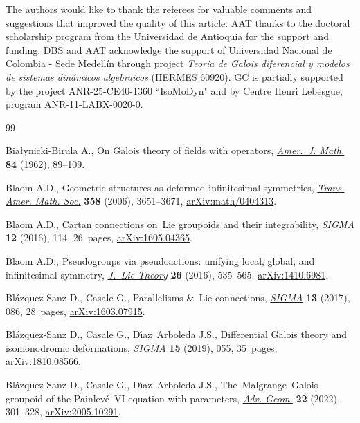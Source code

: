 \documentclass[pdftex]{sigma}
\numberwithin{equation}{section}
\theoremstyle{definition}
\begin{document}
The authors would like to thank the referees for valuable comments and suggestions that improved the quality of this article.
AAT thanks to the doctoral scholarship program from the Universidad de Antioquia for the support and funding.
DBS and AAT acknowledge the support of Universidad Nacional de Colombia - Sede Medell\'in through project \emph{Teoría de Galois diferencial y modelos de sistemas dinámicos algebraicos} (HERMES 60920).
\noindent GC is partially supported by the project ANR-25-CE40-1360 ``IsoMoDyn" and by Centre Henri Lebesgue, program ANR-11-LABX-0020-0.

\begin{thebibliography}{99}
\footnotesize\itemsep=0pt

Bia{\l}ynicki-Birula A., On {G}alois theory of fields with operators,
 \href{https://doi.org/10.2307/2372805}{\textit{Amer.~J. Math.}} \textbf{84}
 (1962), 89--109.

Blaom A.D., Geometric structures as deformed infinitesimal symmetries,
 \href{https://doi.org/10.1090/S0002-9947-06-04057-8}{\textit{Trans. Amer.
 Math. Soc.}} \textbf{358} (2006), 3651--3671,
 \href{https://arxiv.org/abs/math/0404313}{arXiv:math/0404313}.

Blaom A.D., Cartan connections on~{L}ie groupoids and their integrability,
 \href{https://doi.org/10.3842/SIGMA.2016.114}{\textit{SIGMA}} \textbf{12}
 (2016), 114, 26~pages,
 \href{https://arxiv.org/abs/1605.04365}{arXiv:1605.04365}.

Blaom A.D., Pseudogroups via pseudoactions: unifying local, global, and
 infinitesimal symmetry,
 \href{https://doi.org/10.5802/jolt.900}{\textit{J.~Lie Theory}} \textbf{26}
 (2016), 535--565, \href{https://arxiv.org/abs/1410.6981}{arXiv:1410.6981}.

Bl\'azquez-Sanz D., Casale G., Parallelisms \&~{L}ie connections,
 \href{https://doi.org/10.3842/SIGMA.2017.086}{\textit{SIGMA}} \textbf{13}
 (2017), 086, 28~pages,
 \href{https://arxiv.org/abs/1603.07915}{arXiv:1603.07915}.

Bl\'azquez-Sanz D., Casale G., D\'{\i}az~Arboleda J.S., Differential {G}alois
 theory and isomonodromic deformations,
 \href{https://doi.org/10.3842/SIGMA.2019.055}{\textit{SIGMA}} \textbf{15}
 (2019), 055, 35~pages,
 \href{https://arxiv.org/abs/1810.08566}{arXiv:1810.08566}.

Bl\'azquez-Sanz D., Casale G., D\'{\i}az~Arboleda J.S.,
 The~{M}algrange--{G}alois groupoid of the {P}ainlev\'e~{VI} equation with
 parameters, \href{https://doi.org/10.1515/advgeom-2022-0010}{\textit{Adv.
 Geom.}} \textbf{22} (2022), 301--328,
 \href{https://arxiv.org/abs/2005.10291}{arXiv:2005.10291}.


\end{thebibliography}
\end{document}
